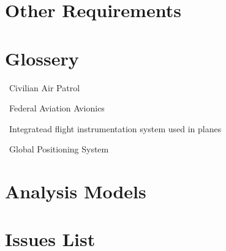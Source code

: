 \documentclass[12pt, letterpaper]{article}
\begin{document}
\section{Other Requirements}
\appendix
\section{Glossery}
\begin{description}[style=nextline, leftmargin=17mm, topsep=0mm,noitemsep]
      \item[CAP] \hfill \ Civilian Air Patrol
      \item[FAA] \hfill \ Federal Aviation Avionics
      \item[Garmin G1000] \hfill \ Integratead flight instrumentation system used in planes
      \item[GPS] \hfill \ Global Positioning System
  \end{description}

\section{Analysis Models}
\section{Issues List}



{}

\end{document}
